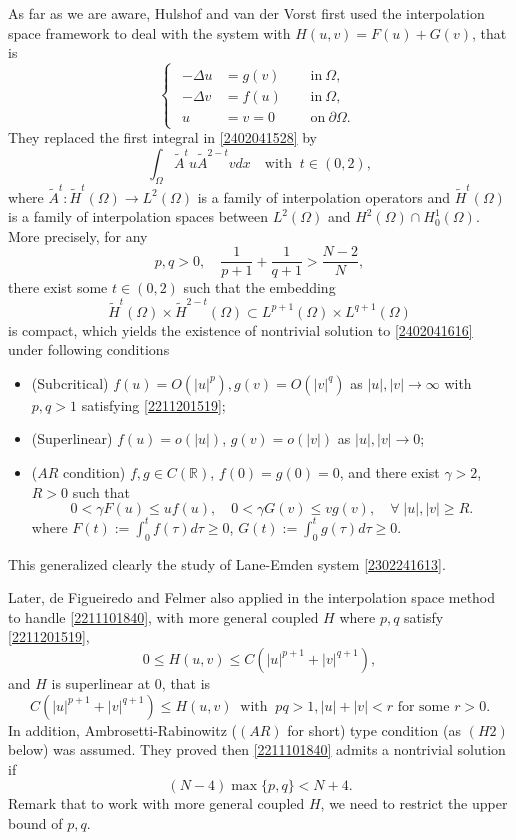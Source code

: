 \documentclass[10pt]{article}
\numberwithin{equation}{section}
\numberwithin{equation}{section}
\begin{document}
As far as we are aware, Hulshof and van der Vorst \cite{Hv1993} first used the interpolation space framework to deal with the system with $H(u, v) = F(u)+G(v)$, that is
\begin{equation}\label{2402041616}
\begin{cases}
\begin{aligned}
-\Delta u & =g(v) \;\;&&\text{in}~\Omega,\\
-\Delta v& =f(u) &&\text{in}~\Omega,\\
u&= v=0 &&\text{on} ~ \partial\Omega.
\end{aligned}
\end{cases}
\end{equation}
They replaced the first integral in \eqref{2402041528} by
\[
\int_{\Omega}\widetilde{A}^{t}u\widetilde{A}^{2-t}v dx \quad \text{with}\;\; t\in (0, 2),
\]
where $\widetilde{A}^t: \widetilde{H}^{t}(\Omega)\to L^2(\Omega)$ is a family of interpolation operators and $\widetilde{H}^{t}(\Omega)$ is a family of interpolation spaces between $L^2(\Omega)$ and $H^2(\Omega)\cap H_0^1(\Omega)$. More precisely, for any
\begin{equation}\label{2211201519}
p, q > 0, \quad \frac{1}{p+1}+\frac{1}{q+1}>\frac{N-2}{N}, \end{equation}
there exist some $t\in (0, 2)$ such that the embedding
$$\widetilde{H}^t(\Omega)\times \widetilde{H}^{2-t}(\Omega)\subset L^{p+1}(\Omega)\times L^{q+1}(\Omega)$$
 is compact, which yields the existence of nontrivial solution to \eqref{2402041616} under following conditions
\begin{itemize}
\item (Subcritical) $f(u)=O(|u|^p), g(v)=O(|v|^q)$ as $|u|, |v|\to \infty$ with $p, q>1$ satisfying \eqref{2211201519};
\item (Superlinear) $f(u)=o(|u|)$, $g(v)=o(|v|)$ as $|u|, |v|\to 0$;
\item ($AR$ condition) $f, g\in C(\mathbb{R})$, $f(0)=g(0)=0$, and there exist $\gamma>2$, $R >0$ such that
\[
0<\gamma F(u)\le uf(u),\quad 0<\gamma G(v)\le vg(v),\quad \forall\; |u|, |v|\ge R.
\]
where $F(t):=\displaystyle \int_0^{t}f(\tau) d\tau\ge 0$, $G(t):=\displaystyle \int_0^{t}g(\tau) d\tau\ge 0$.
\end{itemize}
This generalized clearly the study of Lane-Emden system  \eqref{2302241613}.

Later, de Figueiredo and Felmer also applied  in \cite{dF1994} the interpolation space method to handle \eqref{2211101840}, with more general coupled $H$ where $p, q$ satisfy \eqref{2211201519},
\[
0 \le H(u, v)\le C(|u|^{p+1}+|v|^{q+1}),
\]
and $H$ is superlinear at 0, that is
\[
C(|u|^{p+1}+|v|^{q+1}) \le H(u, v) \;\;\text{with}\;\; pq>1, |u|+|v|< r \mbox{ for some } r > 0.
\]
In addition, Ambrosetti-Rabinowitz ($(AR)$ for short) type condition (as $(H2)$ below) was assumed. They proved then \eqref{2211101840} admits a nontrivial solution if
\[
(N-4)\max\{p, q\}<N+4.
\]
Remark that to work with more general coupled $H$, we need to restrict the upper bound of $p, q$.
\end{document}
